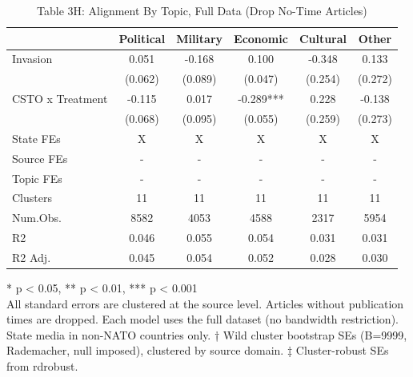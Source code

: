 \begin{table}[!t]
\caption{Table 3H: Alignment By Topic, Full Data (Drop No-Time Articles)} 
\fontsize{12.0pt}{14.4pt}\selectfont
\begin{tabular*}{\linewidth}{@{\extracolsep{\fill}}lccccc}
\toprule
  & Political & Military & Economic & Cultural & Other \\ 
\midrule\addlinespace[2.5pt]
Invasion & 0.051 & -0.168 & 0.100 & -0.348 & 0.133 \\ 
 & (0.062) & (0.089) & (0.047) & (0.254) & (0.272) \\ 
CSTO x Treatment & -0.115 & 0.017 & -0.289*** & 0.228 & -0.138 \\ 
{} & {(0.068)} & {(0.095)} & {(0.055)} & {(0.259)} & {(0.273)} \\ 
State FEs & X & X & X & X & X \\ 
Source FEs & - & - & - & - & - \\ 
Topic FEs & - & - & - & - & - \\ 
Clusters & 11 & 11 & 11 & 11 & 11 \\ 
Num.Obs. & 8582 & 4053 & 4588 & 2317 & 5954 \\ 
R2 & 0.046 & 0.055 & 0.054 & 0.031 & 0.031 \\ 
R2 Adj. & 0.045 & 0.054 & 0.052 & 0.028 & 0.030 \\ 
\bottomrule
\end{tabular*}
\begin{minipage}{\linewidth}
* p < 0.05, ** p < 0.01, *** p < 0.001\\
All standard errors are clustered at the source level. Articles without
publication times are dropped. Each model uses the full dataset (no bandwidth
restriction). State media in non-NATO countries only. † Wild cluster bootstrap
SEs (B=9999, Rademacher, null imposed), clustered by source domain. ‡
Cluster-robust SEs from rdrobust.\\
\end{minipage}
\end{table}

